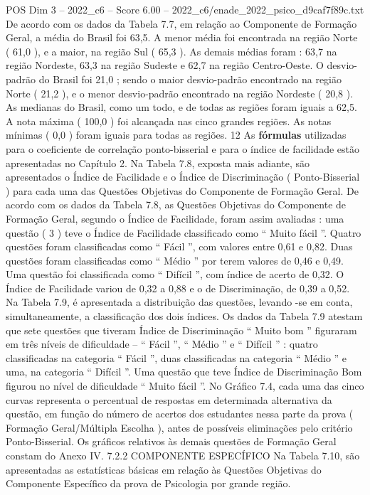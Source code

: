 \begin{textsample}{POS Dim 3 – 2022\_c6 – Score 6.00 – 2022\_c6/enade\_2022\_psico\_d9caf7f89c.txt}
De acordo com os dados da Tabela 7.7, em relação ao Componente de Formação Geral, a média do Brasil foi 63,5.
A menor média foi encontrada na região Norte ( 61,0 ), e a maior, na região Sul ( 65,3 ).
As demais médias foram : 63,7 na região Nordeste, 63,3 na região Sudeste e 62,7 na região Centro-Oeste.
O desvio-padrão do Brasil foi 21,0 ; sendo o maior desvio-padrão encontrado na região Norte ( 21,2 ), e o menor desvio-padrão encontrado na região Nordeste ( 20,8 ).
As medianas do Brasil, como um todo, e de todas as regiões foram iguais a 62,5.
A nota máxima ( 100,0 ) foi alcançada nas cinco grandes regiões.
As notas mínimas ( 0,0 ) foram iguais para todas as regiões. 12 As \textbf{fórmulas} utilizadas para o coeficiente de correlação ponto-bisserial e para o índice de facilidade estão apresentadas no Capítulo 2.
Na Tabela 7.8, exposta mais adiante, são apresentados o Índice de Facilidade e o Índice de Discriminação ( Ponto-Bisserial ) para cada uma das Questões Objetivas do Componente de Formação Geral.
De acordo com os dados da Tabela 7.8, as Questões Objetivas do Componente de Formação Geral, segundo o Índice de Facilidade, foram assim avaliadas : uma questão ( 3 ) teve o Índice de Facilidade classificado como “ Muito fácil ”.
Quatro questões foram classificadas como “ Fácil ”, com valores entre 0,61 e 0,82.
Duas questões foram classificadas como “ Médio ” por terem valores de 0,46 e 0,49.
Uma questão foi classificada como “ Difícil ”, com índice de acerto de 0,32.
O Índice de Facilidade variou de 0,32 a 0,88 e o de Discriminação, de 0,39 a 0,52.
Na Tabela 7.9, é apresentada a distribuição das questões, levando -se em conta, simultaneamente, a classificação dos dois índices.
Os dados da Tabela 7.9 atestam que sete questões que tiveram Índice de Discriminação “ Muito bom ” figuraram em três níveis de dificuldade – “ Fácil ”, “ Médio ” e “ Difícil ” : quatro classificadas na categoria “ Fácil ”, duas classificadas na categoria “ Médio ” e uma, na categoria “ Difícil ”.
Uma questão que teve Índice de Discriminação Bom figurou no nível de dificuldade “ Muito fácil ”.
No Gráfico 7.4, cada uma das cinco curvas representa o percentual de respostas em determinada alternativa da questão, em função do número de acertos dos estudantes nessa parte da prova ( Formação Geral/Múltipla Escolha ), antes de possíveis eliminações pelo critério Ponto-Bisserial.
Os gráficos relativos às demais questões de Formação Geral constam do Anexo IV. 7.2.2 COMPONENTE ESPECÍFICO Na Tabela 7.10, são apresentadas as estatísticas básicas em relação às Questões Objetivas do Componente Específico da prova de Psicologia por grande região.

\end{textsample}
